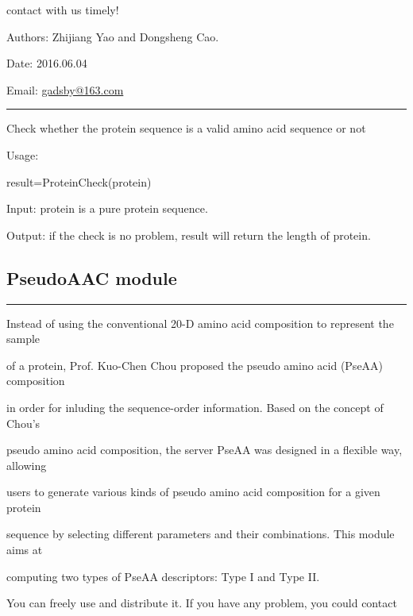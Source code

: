 \documentclass[letterpaper,10pt,english]{sphinxmanual}
\begin{document}
contact with us timely!

Authors: Zhijiang Yao and Dongsheng Cao.

Date: 2016.06.04

Email: \href{mailto:gadsby@163.com}{gadsby@163.com}


\bigskip\hrule{}\bigskip


\begin{fulllineitems}
\label{reference/ProCheck:ProCheck.ProteinCheck}
Check whether the protein sequence is a valid amino acid sequence or not

Usage:

result=ProteinCheck(protein)

Input: protein is a pure protein sequence.

Output: if the check is no problem, result will return the length of protein.

\end{fulllineitems}



\subsection{PseudoAAC module}
\label{reference/PseudoAAC:module-PseudoAAC}\label{reference/PseudoAAC:pseudoaac-module}\label{reference/PseudoAAC::doc}

\bigskip\hrule{}\bigskip


Instead of using the conventional 20-D amino acid composition to represent the sample

of a protein, Prof. Kuo-Chen Chou proposed the pseudo amino acid (PseAA) composition

in order for inluding the sequence-order information. Based on the concept of Chou's

pseudo amino acid composition, the server PseAA was designed in a flexible way, allowing

users to generate various kinds of pseudo amino acid composition for a given protein

sequence by selecting different parameters and their combinations. This module aims at

computing two types of PseAA descriptors: Type I and Type II.

You can freely use and distribute it. If you have any problem, you could contact
\end{document}
